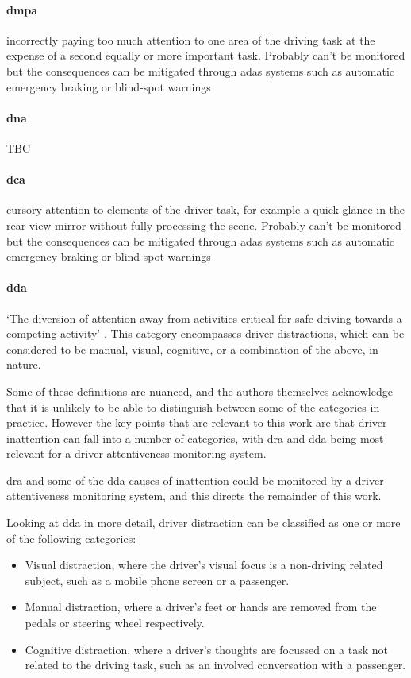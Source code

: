 \documentclass[11pt, parskip=half*,twoside=false]{scrbook}
\begin{document}
\paragraph{\gls{dmpa}} incorrectly paying too much attention to one area of the driving task at the expense of a second equally or more important task. Probably can't be monitored but the consequences can be mitigated through \gls{adas} systems such as automatic emergency braking or blind-spot warnings

\paragraph{\gls{dna}}  TBC

\paragraph{\gls{dca}} cursory attention to elements of the driver task, for example a quick glance in the rear-view mirror without fully processing the scene. Probably can't be monitored but the consequences can be mitigated through \gls{adas} systems such as automatic emergency braking or blind-spot warnings

\paragraph{\gls{dda}} `The diversion of attention away from activities critical for safe driving towards a competing activity' \citep{reganDriverDistractionDriver2011}. This category encompasses driver distractions, which can be considered to be manual, visual, cognitive, or a combination of the above, in nature.

Some of these definitions are nuanced, and the authors themselves acknowledge that it is unlikely to be able to distinguish between some of the categories in practice. However the key points that are relevant to this work are that driver inattention can fall into a number of categories, with \gls{dra} and \gls{dda} being most relevant for a driver attentiveness monitoring system.

\gls{dra} and some of the \gls{dda} causes of inattention could be monitored by a driver attentiveness monitoring system, and this directs the remainder of this work.  

Looking at \gls{dda} in more detail, driver distraction can be classified as one or more of the following categories:
\begin{itemize}
	\item Visual distraction, where the driver's visual focus is a non-driving related subject, such as a mobile phone screen or a passenger.
	\item Manual distraction, where a driver's feet or hands are removed from the pedals or steering wheel respectively.
	\item Cognitive distraction, where a driver's thoughts are focussed on a task not related to the driving task, such as an involved conversation with a passenger.
\end{itemize}
\end{document}
